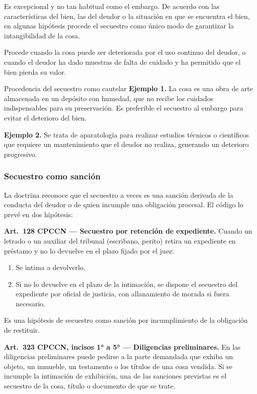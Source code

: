 \documentclass[12pt,oneside]{book}
\begin{document}
Es excepcional y no tan habitual como el embargo. De acuerdo con las características del bien, las del deudor o la situación en que se encuentra el bien, en algunas hipótesis procede el secuestro como único modo de garantizar la intangibilidad de la cosa.

Procede cuando la cosa puede ser deteriorada por el uso continuo del deudor, o cuando el deudor ha dado muestras de falta de cuidado y ha permitido que el bien pierda su valor.

\begin{example}{Procedencia del secuestro como cautelar}
\textbf{Ejemplo 1.} La cosa es una obra de arte almacenada en un depósito con humedad, que no recibe los cuidados indispensables para su preservación. Es preferible el secuestro al embargo para evitar el deterioro del bien.

\textbf{Ejemplo 2.} Se trata de aparatología para realizar estudios técnicos o científicos que requiere un mantenimiento que el deudor no realiza, generando un deterioro progresivo.
\end{example}

\subsubsection{Secuestro como sanción}

La doctrina reconoce que el secuestro a veces es una sanción derivada de la conducta del deudor o de quien incumple una obligación procesal. El código lo prevé en dos hipótesis:

\textbf{Art.\ 128 CPCCN --- Secuestro por retención de expediente.} Cuando un letrado o un auxiliar del tribunal (escribano, perito) retira un expediente en préstamo y no lo devuelve en el plazo fijado por el juez:
\begin{enumerate}
    \item Se intima a devolverlo.
    \item Si no lo devuelve en el plazo de la intimación, se dispone el secuestro del expediente por oficial de justicia, con allanamiento de morada si fuera necesario.
\end{enumerate}
Es una hipótesis de secuestro como sanción por incumplimiento de la obligación de restituir.

\textbf{Art.\ 323 CPCCN, incisos 1° a 5° --- Diligencias preliminares.} En las diligencias preliminares puede pedirse a la parte demandada que exhiba un objeto, un inmueble, un testamento o los títulos de una cosa vendida. Si se incumple la intimación de exhibición, una de las sanciones previstas es el secuestro de la cosa, título o documento de que se trate.
\end{document}
